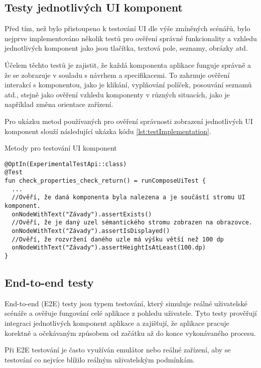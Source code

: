 \subsection{Testy jednotlivých UI komponent}
Před tím, než bylo přistoupeno k testování UI dle výše zmíněných scénářů, bylo nejprve implementováno několik testů pro ověření správné 
funkcionality a vzhledu jednotlivých komponent jako jsou tlačítka, textová pole, seznamy, obrázky atd.

Účelem těchto testů je zajistit, že každá komponenta aplikace funguje správně a že se zobrazuje v souladu s návrhem a specifikacemi. 
To zahrnuje ověření interakcí s komponentou, jako je klikání, vyplňování políček, posouvání seznamů atd., stejně jako ověření vzhledu komponenty v 
různých situacích, jako je například změna orientace zařízení.

\bigskip

Pro ukázku metod používaných pro ověření správnosti zobrazení jednotlivých UI komponent slouží následující ukázka kódu \ref{lst:testImplementation}.

\begin{listing}[H]
  \caption{Metody pro testování UI komponent}\label{lst:testImplementation}
  \begin{verbatim}
@OptIn(ExperimentalTestApi::class)
@Test
fun check_properties_check_return() = runComposeUiTest {
  ...
  //Ověří, že daná komponenta byla nalezena a je součástí stromu UI komponent.
  onNodeWithText("Závady").assertExists()
  //Ověří, že je daný uzel sémantického stromu zobrazen na obrazovce.
  onNodeWithText("Závady").assertIsDisplayed()
  //Ověří, že rozvržení daného uzle má výšku větší než 100 dp
  onNodeWithText("Závady").assertHeightIsAtLeast(100.dp)
}
\end{verbatim}
\end{listing}

\subsection{End-to-end testy}
End-to-end (E2E) testy jsou typem testování, který simuluje reálné uživatelské scénáře a ověřuje fungování celé aplikace z pohledu uživatele.
Tyto testy prověřují integraci jednotlivých komponent aplikace a zajišťují, že aplikace pracuje korektně a očekávaným způsobem od začátku až 
do konce vykonávaného procesu.

Při E2E testování je často využíván emulátor nebo reálné zařízení, aby se testování co nejvíce blížilo reálným uživatelským podmínkám. 

